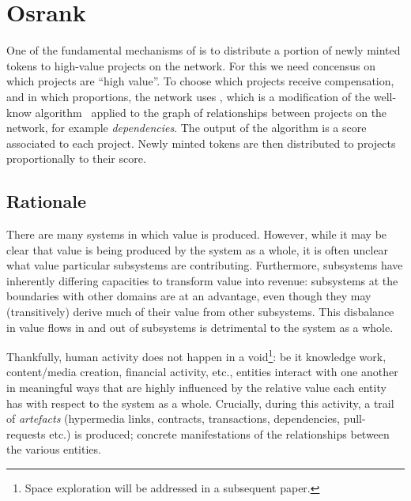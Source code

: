 \section{Osrank}
\label{s:osrank}

\def\Graph{\mathsf{Graph}}
\def\proj{\mathsf{proj}}
\def\user{\mathsf{user}}
\def\dep{\mathsf{dep}}
\def\own{\mathsf{own}}
\def\coown{\mathsf{own}^\circ}
\def\contrib{\mathsf{contrib}}
\def\cocontrib{\mathsf{contrib}^\circ}

One of the fundamental mechanisms of \oscoin{} is to distribute a
portion of newly minted tokens to high-value projects on the
network. For this we need concensus on which projects are ``high
value''.  To choose which projects receive compensation, and in which
proportions, the network uses \osrank{}, which is a modification of
the well-know \pagerank{} algorithm~\cite{pagerank} applied to the
graph of relationships between projects on the network, for example
\emph{dependencies}. The output of the algorithm is a score associated
to each project. Newly minted tokens are then distributed to projects
proportionally to their score.

\subsection{Rationale}

There are many systems in which value is produced. However, while it
may be clear that value is being produced by the system as a whole, it
is often unclear what value particular subsystems are
contributing. Furthermore, subsystems have inherently differing
capacities to transform value into revenue: subsystems at the
boundaries with other domains are at an advantage, even though they
may (transitively) derive much of their value from other
subsystems. This disbalance in value flows in and out of subsystems is
detrimental to the system as a whole.

Thankfully, human activity does not happen in a void\footnote{Space
  exploration will be addressed in a subsequent paper.}: be it
knowledge work, content/media creation, financial activity, etc.,
entities interact with one another in meaningful ways that are highly
influenced by the relative value each entity has with respect to the
system as a whole. Crucially, during this activity, a trail of
\emph{artefacts} (hypermedia links, contracts, transactions,
dependencies, pull-requests etc.) is produced; concrete manifestations
of the relationships between the various entities.

